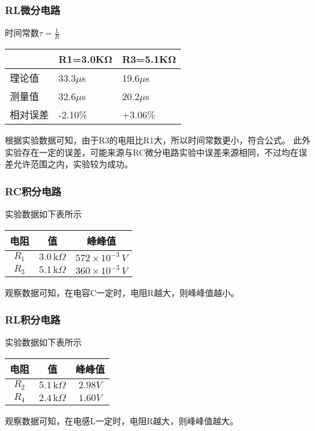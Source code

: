 \documentclass[dvipsnames, svgnames,a4paper,11pt]{article}
\begin{document}
	\subsubsection{RL微分电路}
	时间常数$\tau=\frac LR$
	\begin{table}[H]
		\centering
		\begin{tabular}{|l|l|l|}
		\hline
			~ & R1=3.0KΩ & R3=5.1KΩ \\ \hline
			理论值 & 33.3$\mu$s & 19.6$\mu$s \\ \hline
			测量值 & 32.6$\mu$s & 20.2$\mu$s \\ \hline
			相对误差 & -2.10\% & +3.06\% \\ \hline
		\end{tabular}
	\end{table}
	根据实验数据可知，由于R3的电阻比R1大，所以时间常数更小，符合公式。
	此外实验存在一定的误差，可能来源与RC微分电路实验中误差来源相同，不过均在误差允许范围之内，实验较为成功。
	\subsubsection{RC积分电路}
	实验数据如下表所示
	\begin{table}[H]
		\centering
		
		\begin{tabular}{|ccc|}
		\hline
		电阻 & 值&峰峰值 \\
		\hline
		$R_1$ & $3.0\,\text{k}\Omega$&  $572 \times 10^{-3}\,V$\\
		\hline
		$R_3$ & $5.1\,\text{k}\Omega$ &$360 \times 10^{-3}\,V$\\
		
		\hline
		\end{tabular}
		\end{table}
		观察数据可知，在电容C一定时，电阻R越大，则峰峰值越小。
		\subsubsection{RL积分电路}
	实验数据如下表所示
	\begin{table}[H]
		\centering
		
		\begin{tabular}{|ccc|}
		\hline
		电阻 & 值&峰峰值 \\
		\hline
		$R_2$ & $5.1\,\text{k}\Omega$&  $2.98V$\\
		\hline
		$R_4$ & $2.4\,\text{k}\Omega$ &$1.60V$\\
		
		\hline
		\end{tabular}
		\end{table}
		观察数据可知，在电感L一定时，电阻R越大，则峰峰值越大。
	
\end{document}
